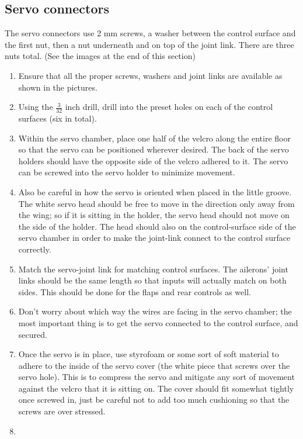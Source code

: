 \documentclass{article}
\begin{document}
\subsection{Servo connectors}
The servo connectors use 2 mm screws, a washer between the control surface and the first nut, then a nut underneath and on top of the joint link. There are three nuts total. (See the images at the end of this section)
\begin{enumerate}
\item Ensure that all the proper screws, washers and joint links are available as shown in the pictures. 
\item Using the $\frac{3}{32}$ inch drill, drill into the preset holes on each of the control surfaces (six in total).
\item Within the servo chamber, place one half of the velcro along the entire floor so that the servo can be positioned wherever desired. The back of the servo holders should have the opposite side of the velcro adhered to it. The servo can be screwed into the servo holder to minimize movement. 
\item Also be careful in how the servo is oriented when placed in the little groove. The white servo head should be free to move in the direction only away from the wing; so if it is sitting in the holder, the servo head should not move on the side of the holder. The head should also on the control-surface side of the servo chamber in order to make the joint-link connect to the control surface correctly.
\item Match the servo-joint link for matching control surfaces. The ailerons' joint links should be the same length so that inputs will actually match on both sides. This should be done for the flaps and rear controls as well.
\item Don't worry about which way the wires are facing in the servo chamber; the most important thing is to get the servo connected to the control surface, and secured. 
\item Once the servo is in place, use styrofoam or some sort of soft material to adhere to the inside of the servo cover (the white piece that screws over the servo hole). This is to compress the servo and mitigate any sort of movement against the velcro that it is sitting on. The cover should fit somewhat tightly once screwed in, just be careful not to add too much cushioning so that the screws are over stressed.
\item 
\end{enumerate}
\end{document}
